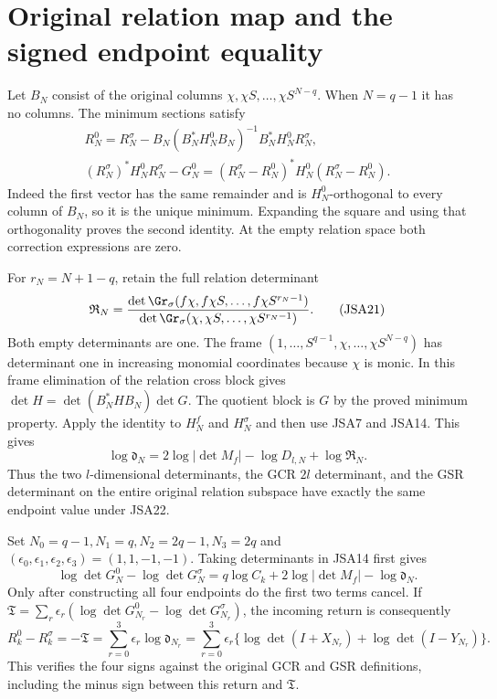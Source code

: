 \section{Original relation map and the signed endpoint equality}

Let $B_N$ consist of the original columns
$\chi,\chi S,\ldots,\chi S^{N-q}$. When $N=q-1$ it has no
columns. The minimum sections satisfy
\[
\begin{gathered}
 R_N^0=R_N^\sigma-
 B_N(B_N^*H_N^0B_N)^{-1}B_N^*H_N^0R_N^\sigma,\\
 (R_N^\sigma)^*H_N^0R_N^\sigma-G_N^0
  =(R_N^\sigma-R_N^0)^*H_N^0(R_N^\sigma-R_N^0).
\end{gathered}\tag{JSA20}
\]
Indeed the first vector has the same remainder and is
$H_N^0$-orthogonal to every column of $B_N$, so it is the
unique minimum. Expanding the square and using that
orthogonality proves the second identity. At the empty
relation space both correction expressions are zero.

For $r_N=N+1-q$, retain the full relation determinant
\[
 \mathfrak R_N=
 \frac{\det\Gr_\sigma(f\chi,f\chi S,\ldots,f\chi S^{r_N-1})}
      {\det\Gr_\sigma(\chi,\chi S,\ldots,\chi S^{r_N-1})}.
\tag{JSA21}
\]
Both empty determinants are one. The frame
$(1,\ldots,S^{q-1},\chi,\ldots,\chi S^{N-q})$ has determinant
one in increasing monomial coordinates because $\chi$ is monic.
In this frame elimination of the relation cross block gives
$\det H=\det(B_N^*HB_N)\det G$. The quotient block is $G$
by the proved minimum property. Apply the identity to $H_N^f$
and $H_N^\sigma$ and then use JSA7 and JSA14. This gives
\[
 \log\mathfrak d_N
   =2\log|\det M_f|-\log D_{l,N}+\log\mathfrak R_N.
\tag{JSA22}
\]
Thus the two $l$-dimensional determinants, the GCR $2l$ determinant,
and the GSR determinant on the entire original relation subspace
have exactly the same endpoint value under JSA22.

Set $N_0=q-1,N_1=q,N_2=2q-1,N_3=2q$ and
$(\epsilon_0,\epsilon_1,\epsilon_2,\epsilon_3)=(1,1,-1,-1)$.
Taking determinants in JSA14 first gives
\[
 \log\det G_N^0-\log\det G_N^\sigma
  =q\log C_k+2\log|\det M_f|-\log\mathfrak d_N.
\tag{JSA23}
\]
Only after constructing all four endpoints do the first two
terms cancel. If $\mathfrak T=\sum_r\epsilon_r
(\log\det G_{N_r}^0-\log\det G_{N_r}^\sigma)$, the incoming
return is consequently
\[
 R_k^0-R_k^\sigma=-\mathfrak T
  =\sum_{r=0}^3\epsilon_r\log\mathfrak d_{N_r}
  =\sum_{r=0}^3\epsilon_r
       \{\log\det(I+X_{N_r})+\log\det(I-Y_{N_r})\}.
\tag{JSA24}
\]
This verifies the four signs against the original GCR and GSR
definitions, including the minus sign between this return and
$\mathfrak T$.

